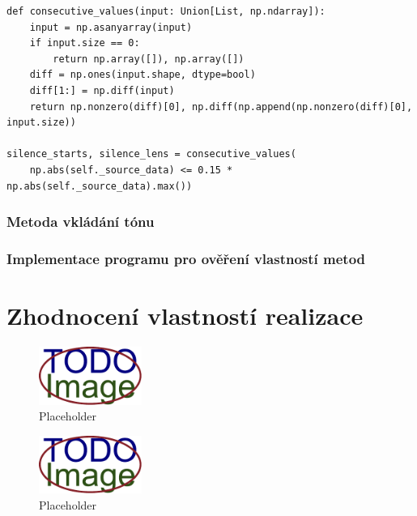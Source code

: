 \begin{lstlisting}[language=PythonPlus, label={lst:silence-intervals},
caption={Nalezení indexů a~délek úseků ticha.}]
def consecutive_values(input: Union[List, np.ndarray]):
    input = np.asanyarray(input)
    if input.size == 0:
        return np.array([]), np.array([])
    diff = np.ones(input.shape, dtype=bool)
    diff[1:] = np.diff(input)
    return np.nonzero(diff)[0], np.diff(np.append(np.nonzero(diff)[0], input.size))

silence_starts, silence_lens = consecutive_values(
    np.abs(self._source_data) <= 0.15 * np.abs(self._source_data).max())
\end{lstlisting}

\subsection*{Metoda vkládání tónu}
\label{sub:tone-insertion-implementation}


\blindtext

\subsection*{Implementace programu pro ověření vlastností metod}
\label{sub:tester-implementation}

\blindtext


\chapter{Zhodnocení vlastností realizace}
\label{cha:method-evaluation}


\blindtext

\blindtext

\begin{figure}[hbt]
    \centering
    \includegraphics[width=0.3\textwidth]{obrazky/placeholder.pdf}
    \caption{Placeholder}
    \label{pic:placeholder}
\end{figure}

\blindtext

\begin{figure}[hbt]
    \centering
    \includegraphics[width=0.3\textwidth]{obrazky/placeholder.pdf}
    \caption{Placeholder}
    \label{pic:placeholder}
\end{figure}

